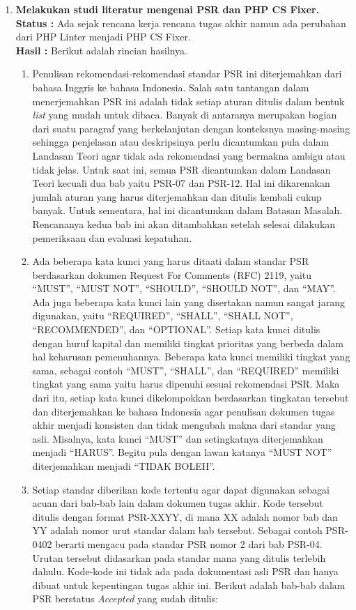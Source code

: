 \documentclass[a4paper,twoside]{article}
\begin{document}
\begin{enumerate}
		\item \textbf{Melakukan studi literatur mengenai PSR dan PHP CS Fixer.}\\
		{\bf Status :} Ada sejak rencana kerja rencana tugas akhir namun ada perubahan dari PHP Linter menjadi PHP CS Fixer.\\
		{\bf Hasil :} Berikut adalah rincian hasilnya.
		\begin{enumerate}
			\item Penulisan rekomendasi-rekomendasi standar PSR ini diterjemahkan dari bahasa Inggris ke bahasa Indonesia. Salah satu tantangan dalam menerjemahkan PSR ini adalah tidak setiap aturan ditulis dalam bentuk \textit{list} yang mudah untuk dibaca. Banyak di antaranya merupakan bagian dari suatu paragraf yang berkelanjutan dengan konteksnya masing-masing sehingga penjelasan atau deskripsinya perlu dicantumkan pula dalam Landasan Teori agar tidak ada rekomendasi yang bermakna ambigu atau tidak jelas. Untuk saat ini, semua PSR dicantumkan dalam Landasan Teori kecuali dua bab yaitu PSR-07 dan PSR-12. Hal ini dikarenakan jumlah aturan yang harus diterjemahkan dan ditulis kembali cukup banyak. Untuk sementara, hal ini dicantumkan dalam Batasan Masalah. Rencananya kedua bab ini akan ditambahkan setelah selesai dilakukan pemeriksaan dan evaluasi kepatuhan.
			\item Ada beberapa kata kunci yang harus ditaati dalam standar PSR berdasarkan dokumen Request For Comments (RFC) 2119, yaitu ``MUST'', ``MUST NOT'', ``SHOULD'', ``SHOULD NOT'', dan ``MAY''. Ada juga beberapa kata kunci lain yang disertakan namun sangat jarang digunakan, yaitu ``REQUIRED'', ``SHALL'', ``SHALL NOT'', ``RECOMMENDED'', dan ``OPTIONAL''. Setiap kata kunci ditulis dengan huruf kapital dan memiliki tingkat prioritas yang berbeda dalam hal keharusan pemenuhannya. Beberapa kata kunci memiliki tingkat yang sama, sebagai contoh ``MUST'', ``SHALL'', dan ``REQUIRED'' memiliki tingkat yang sama yaitu harus dipenuhi sesuai rekomendasi PSR. Maka dari itu, setiap kata kunci dikelompokkan berdasarkan tingkatan tersebut dan diterjemahkan ke bahasa Indonesia agar penulisan dokumen tugas akhir menjadi konsisten dan tidak mengubah makna dari standar yang asli. Misalnya, kata kunci ``MUST'' dan setingkatnya diterjemahkan menjadi ``HARUS''. Begitu pula dengan lawan katanya ``MUST NOT'' diterjemahkan menjadi ``TIDAK BOLEH''.
			\item Setiap standar diberikan kode tertentu agar dapat digunakan sebagai acuan dari bab-bab lain dalam dokumen tugas akhir. Kode tersebut ditulis dengan format PSR-XXYY, di mana XX adalah nomor bab dan YY adalah nomor urut standar dalam bab tersebut. Sebagai contoh PSR-0402 berarti mengacu pada standar PSR nomor 2 dari bab PSR-04. Urutan tersebut didasarkan pada standar mana yang ditulis terlebih dahulu. Kode-kode ini tidak ada pada dokumentasi asli PSR dan hanya dibuat untuk kepentingan tugas akhir ini. Berikut adalah bab-bab dalam PSR berstatus \textit{Accepted} yang sudah ditulis:

\end{enumerate}
\end{enumerate}
\end{document}
